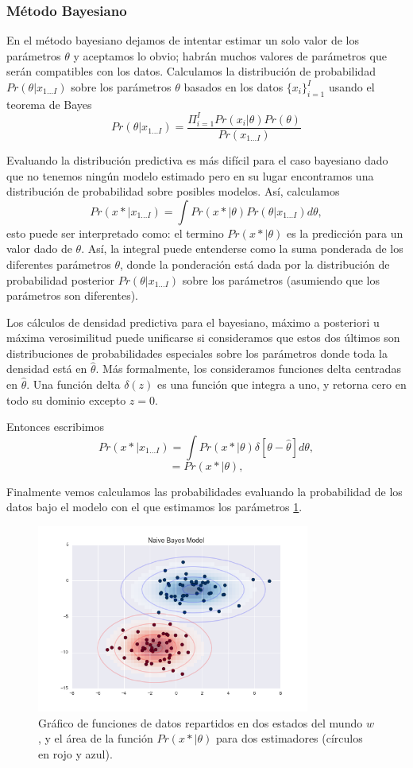 \documentclass[letter,12pt]{report}
\begin{document}
\subsubsection{Método Bayesiano}
En el método bayesiano \cite{Bayes, Bayes2} dejamos de intentar estimar un solo valor de los parámetros
$\theta$ y aceptamos lo obvio; habrán muchos valores de parámetros que serán
compatibles con los datos. Calculamos la distribución de probabilidad
$Pr(\theta|x_{1...I})$ sobre los parámetros $\theta$ basados en los datos
$\{x_i\}_{i=1}^I$ usando el teorema de Bayes
$$Pr(\theta|x_{1...I})=\frac{\Pi_{i=1}^I
Pr(x_i|\theta)Pr(\theta)}{Pr(x_{1...I})}$$

Evaluando la distribución predictiva es más difícil para el caso bayesiano dado que no
tenemos ningún modelo estimado pero en su lugar encontramos una distribución de
probabilidad sobre posibles modelos. Así, calculamos
$$Pr(x*|x_{1...I})=\int Pr(x*|\theta) Pr(\theta|x_{1...I})d\theta,$$
esto puede ser interpretado como: el termino $Pr(x*|\theta)$ es la predicción para un
valor dado de $\theta$. Así, la integral puede entenderse como la suma ponderada de los
diferentes parámetros $\theta$, donde la ponderación está dada por la distribución de
probabilidad posterior $Pr(\theta|x_{1...I})$ sobre los parámetros (asumiendo que
los parámetros son diferentes).

Los cálculos de densidad predictiva para el bayesiano, máximo a posteriori u máxima
verosimilitud puede unificarse si consideramos que estos dos últimos son distribuciones
de probabilidades especiales sobre los parámetros donde toda la densidad está en
$\hat\theta$. Más formalmente, los consideramos funciones delta centradas en
$\hat\theta$. Una función delta $\delta(z)$ es una función que integra a uno, y retorna
cero en todo su dominio excepto $z=0$.

Entonces escribimos
$$Pr(x*|x_{1...I})=\int Pr(x*|\theta) \delta[\theta - \hat\theta]d\theta,$$
$$=Pr(x*|\theta),$$ 

Finalmente vemos calculamos las probabilidades evaluando la probabilidad de los datos
bajo el modelo con el que estimamos los parámetros \ref{fig:bayes}.

\begin{figure}[H]
    \centering
    \includegraphics[width=0.8\textwidth]{bayes}
    \caption{Gráfico de funciones de datos repartidos en dos estados del mundo $w$, y el
    área de la función $Pr(x*|\theta)$ para dos estimadores (círculos en rojo y azul).}
    \label{fig:bayes}
\end{figure}
\end{document}
